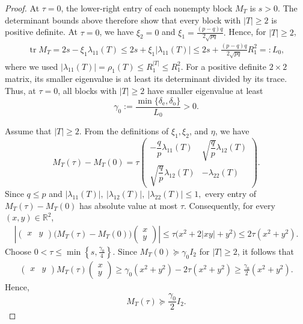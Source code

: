 \documentclass[11pt]{article}
\numberwithin{equation}{section}
\theoremstyle{definition}
\theoremstyle{remark}
\begin{document}
\begin{proof}
At $\tau=0$, the lower-right entry of each nonempty block $M_T$ is
$s>0$.  The determinant bounds above therefore show that every
block with $|T|\geq2$ is positive definite.  At $\tau=0$, we have
$
 \xi_2=0
$
and
$
 \xi_1=\frac{(p-q)q}{2\sqrt{pq}}.
$
Hence, for $|T|\geq2$,
$$
\begin{aligned}
 \operatorname{tr}M_T
 =
 2s-\xi_1\lambda_{11}(T)\leq
 2s+\xi_1|\lambda_{11}(T)|\leq
 2s+\frac{(p-q)q}{2\sqrt{pq}}R_1^2
 =:L_0,
\end{aligned}
$$
where we used
$|\lambda_{11}(T)|=\rho_1(T)\leq R_1^{|T|}\leq R_1^2$.
For a positive definite $2\times2$ matrix, its smaller eigenvalue is
at least its determinant divided by its trace.  Thus, at $\tau=0$,
all blocks with $|T|\geq2$ have smaller eigenvalue at least
$$
 \gamma_0
 :=
 \frac{\min\{\delta_{\mathrm e},\delta_{\mathrm o}\}}{L_0}>0.
$$



Assume that $|T|\geq2$. From the definitions of
$\xi_1,\xi_2$, and $\eta$, we have
$$
 M_T(\tau)-M_T(0)
 =
 \tau
 \begin{pmatrix}
  -\dfrac qp\lambda_{11}(T)&
  \sqrt{\dfrac qp}\lambda_{12}(T)\\[5pt]
  \sqrt{\dfrac qp}\lambda_{12}(T)&
  -\lambda_{22}(T)
 \end{pmatrix}.
$$
Since $q\leq p$ and
$
 |\lambda_{11}(T)|,\ 
 |\lambda_{12}(T)|,\ 
 |\lambda_{22}(T)|
 \leq1,
$
every entry of $M_T(\tau)-M_T(0)$ has absolute value at most $\tau$.
Consequently, for every $(x,y)\in\mathbb R^2$,
$$
\begin{aligned}
\left|
 \begin{pmatrix}x&y\end{pmatrix}
 \bigl(M_T(\tau)-M_T(0)\bigr)
 \begin{pmatrix}x\\y\end{pmatrix}
\right|
\leq
\tau\bigl(x^2+2|xy|+y^2\bigr)\leq
2\tau(x^2+y^2).
\end{aligned}
$$
Choose
$
 0<\tau\leq\min\left\{s,\frac{\gamma_0}{4}\right\}.
$
Since $M_T(0)\succeq\gamma_0I_2$ for $|T|\geq2$, it follows that
$$
\begin{aligned}
 \begin{pmatrix}x&y\end{pmatrix}
 M_T(\tau)
 \begin{pmatrix}x\\y\end{pmatrix}
 \geq
 \gamma_0(x^2+y^2)-2\tau(x^2+y^2)\geq
 \frac{\gamma_0}{2}(x^2+y^2).
\end{aligned}
$$
Hence,
$$
 M_T(\tau)\succeq\frac{\gamma_0}{2}I_2.
$$




\end{proof}
\end{document}
